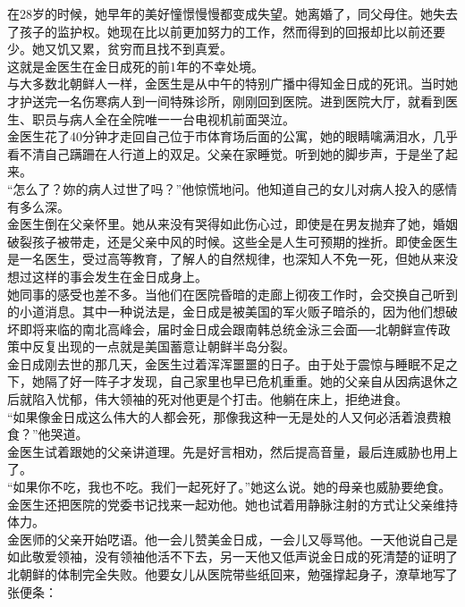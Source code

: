 在28岁的时候，她早年的美好憧憬慢慢都变成失望。她离婚了，同父母住。她失去了孩子的监护权。她现在比以前更加努力的工作，然而得到的回报却比以前还要少。她又饥又累，贫穷而且找不到真爱。\\

这就是金医生在金日成死的前1年的不幸处境。\\

与大多数北朝鲜人一样，金医生是从中午的特别广播中得知金日成的死讯。当时她才护送完一名伤寒病人到一间特殊诊所，刚刚回到医院。进到医院大厅，就看到医生、职员与病人全在全院唯一一台电视机前面哭泣。\\

金医生花了40分钟才走回自己位于市体育场后面的公寓，她的眼睛噙满泪水，几乎看不清自己蹒跚在人行道上的双足。父亲在家睡觉。听到她的脚步声，于是坐了起来。\\

“怎么了？妳的病人过世了吗？”他惊慌地问。他知道自己的女儿对病人投入的感情有多么深。\\

金医生倒在父亲怀里。她从来没有哭得如此伤心过，即使是在男友抛弃了她，婚姻破裂孩子被带走，还是父亲中风的时候。这些全是人生可预期的挫折。即使金医生是一名医生，受过高等教育，了解人的自然规律，也深知人不免一死，但她从来没想过这样的事会发生在金日成身上。\\

她同事的感受也差不多。当他们在医院昏暗的走廊上彻夜工作时，会交换自己听到的小道消息。其中一种说法是，金日成是被美国的军火贩子暗杀的，因为他们想破坏即将来临的南北高峰会，届时金日成会跟南韩总统金泳三会面──北朝鲜宣传政策中反复出现的一点就是美国蓄意让朝鲜半岛分裂。\\

金日成刚去世的那几天，金医生过着浑浑噩噩的日子。由于处于震惊与睡眠不足之下，她隔了好一阵子才发现，自己家里也早已危机重重。她的父亲自从因病退休之后就陷入忧郁，伟大领袖的死对他更是个打击。他躺在床上，拒绝进食。\\

“如果像金日成这么伟大的人都会死，那像我这种一无是处的人又何必活着浪费粮食？”他哭道。\\

金医生试着跟她的父亲讲道理。先是好言相劝，然后提高音量，最后连威胁也用上了。\\

“如果你不吃，我也不吃。我们一起死好了。”她这么说。她的母亲也威胁要绝食。金医生还把医院的党委书记找来一起劝他。她也试着用静脉注射的方式让父亲维持体力。\\

金医师的父亲开始呓语。他一会儿赞美金日成，一会儿又辱骂他。一天他说自己是如此敬爱领袖，没有领袖他活不下去，另一天他又低声说金日成的死清楚的证明了北朝鲜的体制完全失败。他要女儿从医院带些纸回来，勉强撑起身子，潦草地写了张便条：\\

